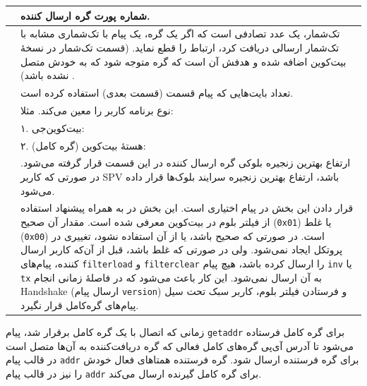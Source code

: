\begin{xltabular}{\textwidth}{|c|X|}
	\hline
	 & {
		شماره پورت گره ارسال کننده.
	}\\
	
	\hline
	 & {
		تک‌شمار، یک عدد تصادفی است که اگر یک گره،‌ یک پیام با تک‌شماری مشابه با تک‌شمار ارسالی دریافت کرد، ارتباط را قطع نماید. (قسمت تک‌شمار در نسخهٔ  بیت‌کوین اضافه شده و هدفش آن است که گره متوجه شود که به خودش متصل نشده باشد)
		.
	}\\
	\hline
	 & {
		تعداد بایت‌هایی که پیام قسمت  (قسمت بعدی) استفاده کرده است.
	}\\
	
	\hline
	 & {
		نوع برنامه کاربر را معین می‌کند. مثلا:
	}\\
	
	&  {%
		۱. بیت‌کوین‌جی: 
		} \\
	&  {%
		۲. هستهٔ بیت‌کوین (گره کامل): 
		} \\
	
	\hline
	 & {
		ارتفاع بهترین زنجیره‌ بلوکی گره ارسال کننده در این قسمت قرار گرفته می‌شود. در صورتی که کاربر SPV باشد، ارتفاع بهترین زنجیره سرایند بلوک‌‌ها قرار داده می‌شود.
	}\\
	
	\hline
	 & {
		قرار دادن این بخش در پیام اختیاری است. این بخش در \cite{Hearn2013} به همراه پیشنهاد استفاده از فیلتر بلوم در بیت‌کوین معرفی شده است. مقدار آن صحیح (\texttt{0x01}) یا غلط (\texttt{0x00}) است. در صورتی که صحیح باشد، یا از آن استفاده نشود، تغییری در پروتکل ایجاد نمی‌شود. ولی در صورتی که غلط باشد، قبل از آن‌که کاربر ارسال کننده، پیام‌های \texttt{filterload} و \texttt{filterclear} را ارسال کرده باشد، هیچ پیام \texttt{inv} یا \texttt{tx} به آن ارسال نمی‌شود. این کار باعث می‌شود که در فاصلهٔ زمانی انجام 
		\gls{Handshake}
		(ارسال پیام \texttt{version}) و فرستادن فیلتر بلوم، کاربر سبک تحت سیل پیام‌های گره‌کامل قرار نگیرد. 
	}\\
	
	
	\hline
\end{xltabular}

زمانی که اتصال با یک گره کامل برقرار شد، پیام \texttt{getaddr} برای گره کامل فرستاده می‌شود تا آدرس آی‌پی گره‌های کامل فعالی که گره دریافت‌کننده به آن‌ها متصل است در قالب پیام \texttt{addr} برای گره فرستنده ارسال شود. گره فرستنده همتا‌های فعال خودش را نیز در قالب پیام \texttt{addr} برای گره کامل گیرنده ارسال می‌کند.

